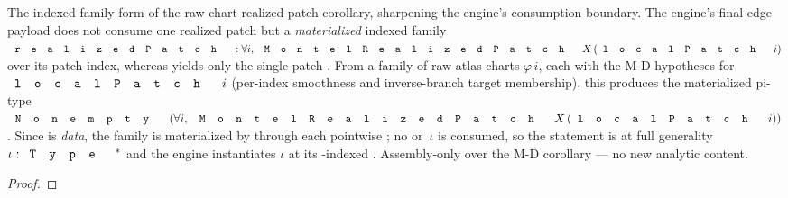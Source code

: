 \begin{lemma}
\label{lem:montel-raw-source-chart-realized-family}
The indexed family form of the raw-chart realized-patch corollary, sharpening the
engine's consumption boundary. The engine's final-edge payload does not consume
one realized patch but a \emph{materialized} indexed family
\(\code{realizedPatch}:\forall i,\ \code{MontelRealizedPatch}\,X\,(\code{localPatch}\,i)\)
over its patch index, whereas
 yields only the single-patch
. From a family of raw atlas charts \(\varphi\,i\), each with the
M-D hypotheses for \(\code{localPatch}\,i\) (per-index smoothness and
inverse-branch target membership), this produces the materialized pi-type
\(\code{Nonempty}\,(\forall i,\ \code{MontelRealizedPatch}\,X\,(\code{localPatch}\,i))\).
Since  is \emph{data}, the family is materialized by
 through each pointwise ; no 
or \,\(\iota\) is consumed, so the statement is at full generality
\(\iota:\code{Type}^*\) and the engine instantiates \(\iota\) at its
-indexed . Assembly-only over the M-D corollary —
no new analytic content.
\leanok
\end{lemma}
\begin{proof}\leanok\end{proof}

